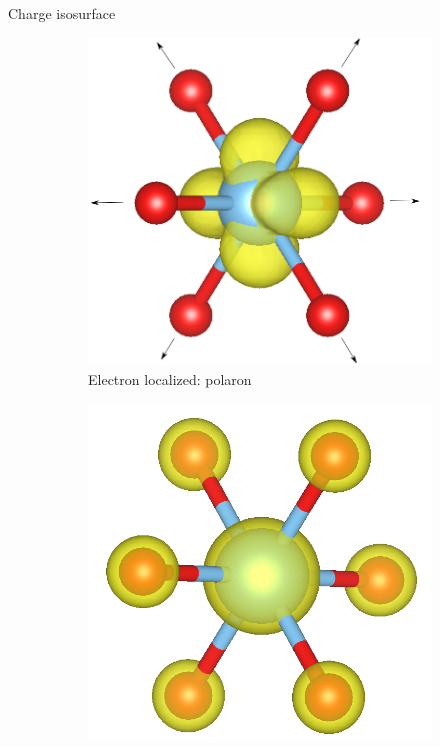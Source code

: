 \documentclass[11pt, xcolor=dvipsnames, aspectratio=43]{beamer}
\begin{document}
\begin{frame}{Charge isosurface}
    \begin{figure}[p]
        \centering
        \begin{subfigure}[b]{0.49\textwidth}
            \centering
            \includegraphics[height=0.53\textheight]{figures/PARCHG_polaron}
            \caption{Electron localized: polaron}
            \label{fig:polaron_iso}
        \end{subfigure}
        \hfill
        \begin{subfigure}[b]{0.49\textwidth}
            \centering
            \includegraphics[height=0.53\textheight]{figures/PARCHG_delocalized}

\end{subfigure}
\end{figure}
\end{frame}
\end{document}
